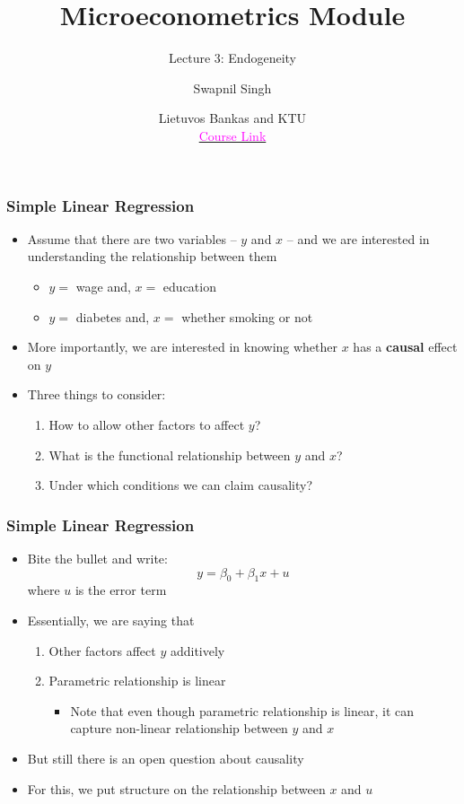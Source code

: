 \documentclass{beamer}
\title{Microeconometrics Module}
\subtitle{Lecture 3: Endogeneity}
\author{Swapnil Singh}
\date{Lietuvos Bankas and KTU \\ \href{https://github.com/swapnil1987/econometrics-2024}{\textcolor{magenta}{Course Link}}}
\begin{document}
	
	\maketitle
	
\begin{frame}
	\frametitle{Simple Linear Regression}
	\begin{itemize}
		\item Assume that there are two variables -- $y$ and $x$ -- and we are interested in understanding the relationship between them
		\begin{itemize}
			\item $y =$ wage and, $x = $ education
			\item $y =$ diabetes and, $x =$ whether smoking or not
		\end{itemize}
		\item More importantly, we are interested in knowing whether $x$ has a \textbf{causal} effect on $y$
		\item Three things to consider:
		\begin{enumerate}
			\item How to allow other factors to affect $y$?
			\item What is the functional relationship between $y$ and $x$?
			\item Under which conditions we can claim causality?
		\end{enumerate}
	\end{itemize}
\end{frame}


\begin{frame}
	\frametitle{Simple Linear Regression}
	\begin{itemize}
		\item Bite the bullet and write:
		$$ y = \beta_0 + \beta_1 x + u $$
		where $u$ is the error term
		\item Essentially, we are saying that 
		\begin{enumerate}
			\item Other factors affect $y$ additively
			\item Parametric relationship is linear
			\begin{itemize}
				\item Note that even though parametric relationship is linear, it can capture non-linear relationship between $y$ and $x$
			\end{itemize}
		\end{enumerate}
		\item But still there is an open question about causality
		\item For this, we put structure on the relationship between $x$ and $u$
	\end{itemize}
\end{frame}
\end{document}
